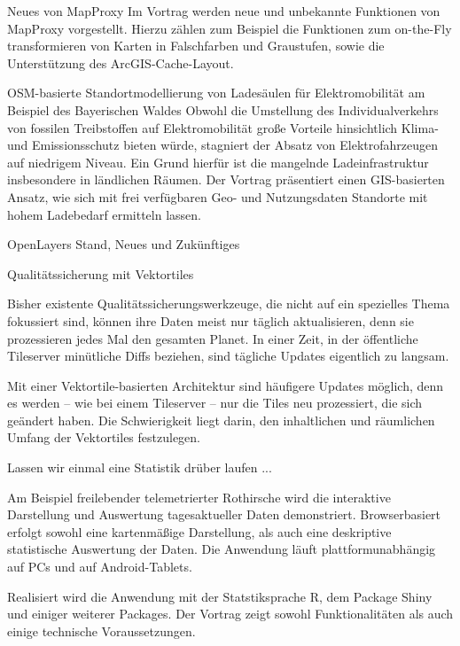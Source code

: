 %
{Neues von MapProxy}%
{}%
{Im Vortrag werden neue und unbekannte Funktionen von MapProxy vorgestellt. Hierzu zählen zum
Beispiel die Funktionen zum on-the-Fly transformieren von Karten in Falschfarben und Graustufen,
sowie die Unterstützung des ArcGIS-Cache-Layout.}

%
{OSM-basierte Standortmodellierung von Ladesäulen für Elektromobilität am Beispiel des Bayerischen Waldes}%
{}%
{Obwohl die Umstellung des Individualverkehrs von fossilen Treibstoffen auf Elektromobilität große
Vorteile hinsichtlich Klima- und Emissionsschutz bieten würde, stagniert der Absatz von
Elektrofahrzeugen auf niedrigem Niveau. Ein Grund hierfür ist die mangelnde Ladeinfrastruktur
insbesondere in ländlichen Räumen. Der Vortrag präsentiert einen GIS-basierten Ansatz, wie sich mit
frei verfügbaren Geo- und Nutzungsdaten Standorte mit hohem Ladebedarf ermitteln lassen.}

%
{OpenLayers}%
{Stand, Neues und Zukünftiges}%
{}

%
{Qualitätssicherung mit Vektortiles}%
{}%
{Bisher existente Qualitätssicherungswerkzeuge, die nicht auf ein spezielles Thema fokussiert sind,
  können ihre Daten meist nur täglich aktualisieren, denn sie prozessieren jedes Mal den gesamten
  Planet. In einer Zeit, in der öffentliche Tileserver minütliche Diffs beziehen, sind tägliche
  Updates eigentlich zu langsam.

Mit einer Vektortile-basierten Architektur sind häufigere Updates möglich, denn es werden – wie bei
einem Tileserver – nur die Tiles neu prozessiert, die sich geändert haben. Die Schwierigkeit liegt
darin, den inhaltlichen und räumlichen Umfang der Vektortiles festzulegen.}

%
{Lassen wir einmal eine Statistik drüber laufen ...}%
{%
}%
{Am Beispiel freilebender telemetrierter Rothirsche wird die interaktive Darstellung und Auswertung
  tagesaktueller Daten demonstriert. Browserbasiert erfolgt sowohl eine kartenmäßige Darstellung,
  als auch eine deskriptive statistische Auswertung der Daten.
  Die Anwendung läuft plattformunabhängig auf
  PCs und auf Android-Tablets.

Realisiert wird die Anwendung mit der Statstiksprache R, dem Package Shiny und einiger weiterer
Packages. Der Vortrag zeigt sowohl Funktionalitäten als auch einige technische Voraussetzungen.}

